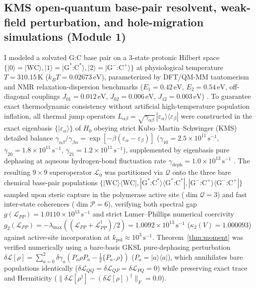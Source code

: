 \documentclass[10pt,letterpaper]{article}
\theoremstyle{plain}
\theoremstyle{definition}
\newcommand{\Lcal}{\mathcal{L}}
\newcommand{\Qcal}{\mathcal{Q}}
\newcommand{\Pcal}{\mathcal{P}}
\begin{document}
\subsection*{KMS open-quantum base-pair resolvent, weak-field perturbation, and hole-migration simulations (Module 1)}

I modeled a solvated G:C base pair on a 3-state protonic Hilbert space $\{|0\rangle = |\text{WC}\rangle, |1\rangle = |\mathrm{G}^*\text{:}\mathrm{C}^*\rangle, |2\rangle = |\mathrm{G}^-\text{:}\mathrm{C}^+\rangle\}$ at physiological temperature $T = 310.15\,\mathrm{K}$ ($k_B T = 0.02673\,\mathrm{eV}$), parameterized by DFT/QM-MM tautomerism and NMR relaxation-dispersion benchmarks ($E_1 = 0.42\,\mathrm{eV}$, $E_2 = 0.54\,\mathrm{eV}$, off-diagonal couplings $J_{01} = 0.012\,\mathrm{eV}$, $J_{02} = 0.006\,\mathrm{eV}$, $J_{12} = 0.003\,\mathrm{eV}$) \cite{kimsey2018nature,slocombe2021pccp,slocombe2022commchem}. To guarantee exact thermodynamic consistency without artificial high-temperature population inflation, all thermal jump operators $L_{\alpha\beta} = \sqrt{\gamma_{\alpha\beta}}\,|\varepsilon_\alpha\rangle\langle\varepsilon_\beta|$ were constructed in the exact eigenbasis $\{|\varepsilon_\alpha\rangle\}$ of $H_0$ obeying strict Kubo--Martin--Schwinger (KMS) detailed balance $\gamma_{\alpha\beta}/\gamma_{\beta\alpha} = \exp[-\beta(\varepsilon_\alpha - \varepsilon_\beta)]$ ($\gamma_{10} = 2.5 \times 10^{11}\,\mathrm{s}^{-1}$, $\gamma_{20} = 1.8 \times 10^{11}\,\mathrm{s}^{-1}$, $\gamma_{21} = 1.2 \times 10^{11}\,\mathrm{s}^{-1}$), supplemented by eigenbasis pure dephasing at aqueous hydrogen-bond fluctuation rate $\gamma_{\mathrm{deph}} = 1.0 \times 10^{13}\,\mathrm{s}^{-1}$ \cite{slocombe2022commchem,abrantes2025pccp}. The resulting $9 \times 9$ superoperator $\Lcal_0$ was partitioned via $\Qcal$ onto the three bare chemical base-pair populations $\{|\text{WC}\rangle\langle\text{WC}|, |\mathrm{G}^*\text{:}\mathrm{C}^*\rangle\langle\mathrm{G}^*\text{:}\mathrm{C}^*|, |\mathrm{G}^-\text{:}\mathrm{C}^+\rangle\langle\mathrm{G}^-\text{:}\mathrm{C}^+|\}$ sampled upon steric capture in the polymerase active site ($\dim\Qcal = 3$) and fast inter-state coherences ($\dim\Pcal = 6$), verifying both spectral gap $g(\Lcal_{PP}) = 1.0110 \times 10^{13}\,\mathrm{s}^{-1}$ and strict Lumer--Phillips numerical coercivity $g_2(\Lcal_{PP}) = -\lambda_{\max}((\Lcal_{PP}+\Lcal_{PP}^\dagger)/2) = 1.0092 \times 10^{13}\,\mathrm{s}^{-1}$ ($\kappa_2(V) = 1.000093$) against active-site incorporation at $k_{\mathrm{pol}} \approx 10^3\,\mathrm{s}^{-1}$. Theorem~\ref{thm:moment} was verified numerically using a bare-basis GKSL pure-dephasing perturbation $\delta\Lcal[\rho] = \sum_{a=0}^2 \delta\gamma_a (P_a \rho P_a - \frac{1}{2}\{P_a, \rho\})$ ($P_a = |a\rangle\langle a|$), which annihilates bare populations identically ($\delta\Lcal_{QQ} = \delta\Lcal_{QP} = \delta\Lcal_{PQ} = 0$) while preserving exact trace and Hermiticity ($\|\delta\Lcal[\rho^\dagger] - (\delta\Lcal[\rho])^\dagger\|_F = 0.0$).
\end{document}
